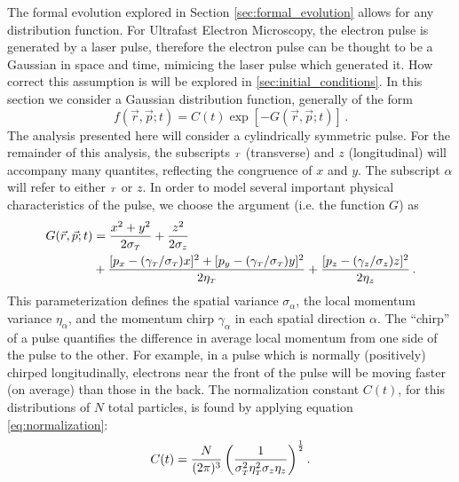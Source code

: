 The formal evolution explored in Section \ref{sec:formal_evolution} allows for any distribution function.
For Ultrafast Electron Microscopy, the electron pulse is generated by a laser pulse, therefore the electron pulse can be thought to be a Gaussian in space and time, mimicing the laser pulse which generated it.
How correct this assumption is will be explored in \ref{sec:initial_conditions}.
In this section we consider a Gaussian distribution function, generally of the form
\begin{equation}
  f(\vec{r}, \vec{p}; t) = C(t)\exp \left[ - G(\vec{r}, \vec{p}; t) \right] \,\text{.}
\end{equation}
The analysis presented here will consider a cylindrically symmetric pulse.
For the remainder of this analysis, the subscripts ${\scriptscriptstyle T}$ (transverse) and $z$ (longitudinal) will accompany many quantites, reflecting the congruence of $x$ and $y$.
The subscript $\alpha$ will refer to either ${\scriptscriptstyle T}$ or $z$.
In order to model several important physical characteristics of the pulse, we choose the argument (i.e. the function $G$) as
\begin{equation} \label{eq:gaussian_exponent}
\begin{split}
  G(\vec{r}, \vec{p}; t) &= \frac{x^2 + y^2}{2 \sigma_{{\scriptscriptstyle T}}} + \frac{z^2}{2 \sigma_{z}} \\
  &+\frac{
        [p_x - (\gamma_{{\scriptscriptstyle T}}/\sigma_{{\scriptscriptstyle T}}) x ]^2 
      + [p_y - (\gamma_{{\scriptscriptstyle T}}/\sigma_{{\scriptscriptstyle T}}) y ]^2
    }{2 \eta_{{\scriptscriptstyle T}}}
  + \frac{ [p_z - (\gamma_{z}/\sigma_{z}) z ]^2 }{2 \eta_{z}} \,\text{.}
\end{split}
\end{equation}
This parameterization defines the spatial variance $\sigma_{\alpha}$, the local momentum variance $\eta_{\alpha}$, and the momentum chirp $\gamma_{\alpha}$ in each spatial direction $\alpha$.
The ``chirp'' of a pulse quantifies the difference in average local momentum from one side of the pulse to the other.
For example, in a pulse which is normally (positively) chirped longitudinally, electrons near the front of the pulse will be moving faster (on average) than those in the back.
The normalization constant $C(t)$, for this distributions of $N$ total particles, is found by applying equation \ref{eq:normalization}:
\begin{equation}
  C(t) = \frac{N}{(2\pi)^3} 
  \left( 
    \frac{1}{\sigma_{{\scriptscriptstyle T}}^2\eta_{{\scriptscriptstyle T}}^2\sigma_{z}\eta_{z}}
  \right)^{\frac{1}{2}} \text{.}
\end{equation}

